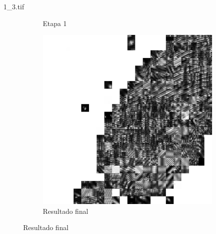 \documentclass{beamer}
\begin{document}
\begin{frame}{1\_3.tif}
\begin{figure}
\begin{subfigure}[!ht]{0.32\textwidth}
                \caption{Etapa 1}
            \end{subfigure}
            \begin{subfigure}[!ht]{0.32\textwidth}
                \includegraphics[width=\columnwidth]{Fingerprints/1_3_final.jpg}
                \caption{Resultado final}
            \end{subfigure}
        \end{figure}
    \end{frame}
\end{document}
